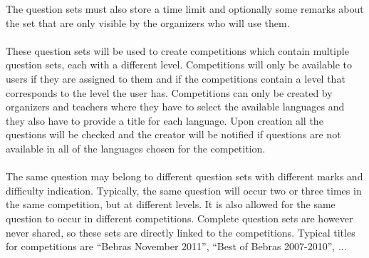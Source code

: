 	The question sets must also store a time limit and optionally some remarks about the
	set that are only visible by the organizers who will use them. \\
	\\
	These question sets will be used to create competitions which contain multiple
	question sets, each with a different level. Competitions will only be available to users if
	they are assigned to them and if the competitions contain a level that corresponds to
	the level the user has. Competitions can only be created by organizers and teachers where they have
	to select the available languages and they also have to provide a title for each
	language. Upon creation all the questions will be checked and the creator will be
	notified if questions are not available in all of the languages chosen for the
	competition.\\
	\\
	The same question may belong to different question sets with different marks and
	difficulty indication. Typically, the same question will occur two or three times in
	the same competition, but at different levels. It is also allowed for the same
	question to occur in different competitions. Complete question sets are however never
	shared, so these sets are directly linked to the competitions. Typical titles for
	competitions are ``Bebras November 2011'', ``Best of Bebras 2007-2010'', ...
	
